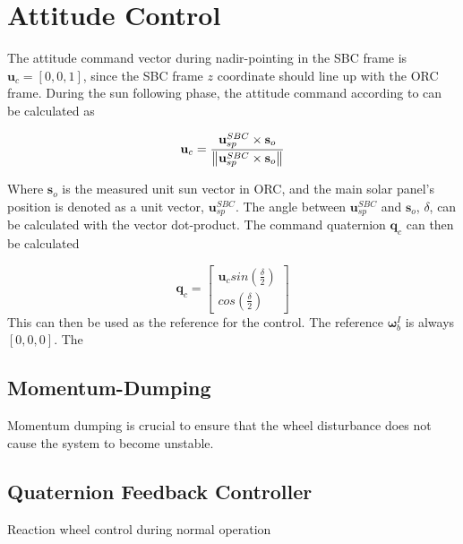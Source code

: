 \section{Attitude Control}
The attitude command vector during nadir-pointing in the SBC frame is $\mathbf{u}_c = [0, 0, 1]$, since the SBC frame $z$ coordinate should line up with the ORC frame. During the sun following phase, the attitude command according to \cite{chen2000ground} can be calculated as 

\begin{equation}
	\mathbf{u}_c = \frac{\mathbf{u}_{sp}^{SBC} \times \mathbf{s}_o}{\left\lVert\mathbf{u}_{sp}^{SBC} \times \mathbf{s}_o\right\rVert}
\end{equation}

Where $\mathbf{s}_o$ is the measured unit sun vector in ORC, and the main solar panel's position is denoted as a unit vector, $\mathbf{u}_{sp}^{SBC}$. The angle between $\mathbf{u}_{sp}^{SBC}$ and $\mathbf{s}_o$, $\delta$, can be calculated with the vector dot-product. The command quaternion $\mathbf{q}_c$ can then be calculated

\begin{equation}
	\mathbf{q}_c = \begin{bmatrix}
		\mathbf{u}_c sin(\frac{\delta}{2}) \\
		cos(\frac{\delta}{2})
	\end{bmatrix}
\end{equation}
This can then be used as the reference for the control. The reference $\boldsymbol{\omega}_b^I$ is always $[0, 0, 0]$. The 

\subsection{Momentum-Dumping}
Momentum dumping is crucial to ensure that the wheel disturbance does not cause the system to become unstable.

\subsection{Quaternion Feedback Controller}
Reaction wheel control during normal operation

